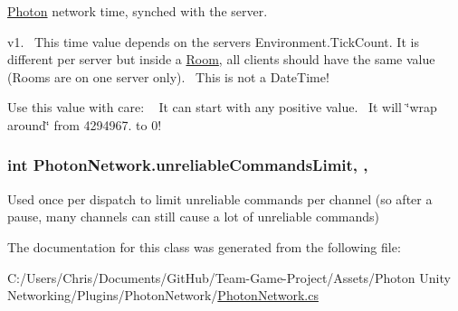 \hyperlink{namespace_photon}{Photon} network time, synched with the server. 

v1.~\newline
 This time value depends on the server\textquotesingle{}s Environment.\+Tick\+Count. It is different per server but inside a \hyperlink{class_room}{Room}, all clients should have the same value (Rooms are on one server only).~\newline
 This is not a Date\+Time!~\newline


Use this value with care\+: ~\newline
 It can start with any positive value.~\newline
 It will \char`\"{}wrap around\char`\"{} from 4294967. to 0! 
\subsubsection[{\texorpdfstring{unreliable\+Commands\+Limit}{unreliableCommandsLimit}}]{\setlength{\rightskip}{0pt plus 5cm}int Photon\+Network.\+unreliable\+Commands\+Limit\hspace{0.3cm}{\ttfamily [static]}, {\ttfamily [get]}, {\ttfamily [set]}}\hypertarget{class_photon_network_a3315be88f62dbdc24819946fc6171e08}{}\label{class_photon_network_a3315be88f62dbdc24819946fc6171e08}


Used once per dispatch to limit unreliable commands per channel (so after a pause, many channels can still cause a lot of unreliable commands) 



The documentation for this class was generated from the following file\+:\begin{DoxyCompactItemize}
\item 
C\+:/\+Users/\+Chris/\+Documents/\+Git\+Hub/\+Team-\/\+Game-\/\+Project/\+Assets/\+Photon Unity Networking/\+Plugins/\+Photon\+Network/\hyperlink{_photon_network_8cs}{Photon\+Network.\+cs}\end{DoxyCompactItemize}
